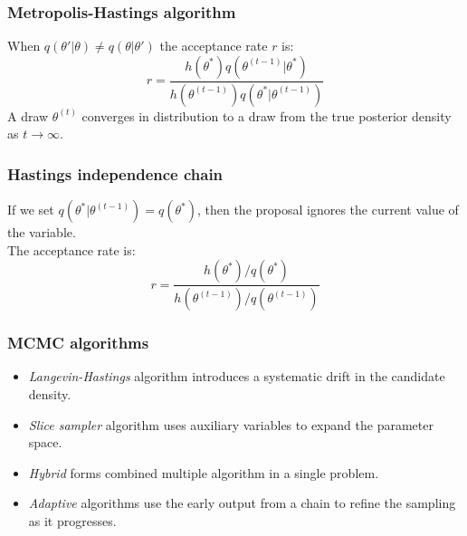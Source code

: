 \documentclass{beamer}
\newcommand{\1}{\ensuremath{\mathbf{1}}}
\begin{document}
%
%
%
\begin{frame}\frametitle{Metropolis-Hastings algorithm}
	When $q(\theta'|\theta) \neq q(\theta|\theta')$ the acceptance rate $r$ is:
	\begin{equation}
		r = \frac{h(\theta^*)q(\theta^{(t-1)}|\theta^*)}{h(\theta^{(t-1)})q(\theta^*|\theta^{(t-1)})}
	\end{equation}
	A draw $\theta^{(t)}$ converges in distribution to a draw from the true posterior density as $t \to \infty$.
\end{frame}
%
%
%
\begin{frame}\frametitle{Hastings independence chain}
	If we set $q(\theta^*|\theta^{(t-1)}) = q(\theta^*)$, then the proposal ignores the current value of the variable.\\[2ex]
	The acceptance rate is:
	\begin{equation}
		r = \frac{h(\theta^*)/q(\theta^*)}{h(\theta^{(t-1)})/q(\theta^{(t-1)})}
	\end{equation}		
\end{frame}
%
%
%
\begin{frame}\frametitle{MCMC algorithms}
	\begin{itemize}
		\item \emph{Langevin-Hastings} algorithm introduces a systematic drift in the candidate density.
		\item \emph{Slice sampler} algorithm uses auxiliary variables to expand the parameter space.
		\item \emph{Hybrid} forms combined multiple algorithm in a single problem.
		\item \emph{Adaptive} algorithms use the early output from a chain to refine the sampling as it progresses.
	\end{itemize}
\end{frame}
%
%
%
\end{document}
